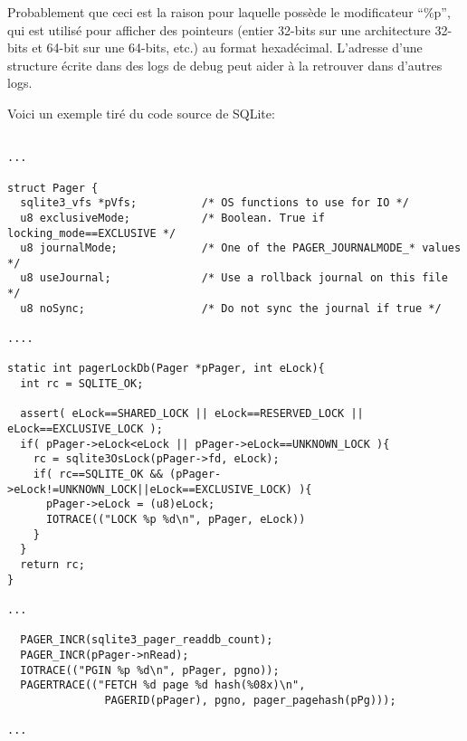 Probablement que ceci est la raison pour laquelle \printf possède le modificateur
``\%p'', qui est utilisé pour afficher des pointeurs (entier 32-bits sur une architecture
32-bits et 64-bit sur une 64-bits, etc.) au format hexadécimal.
L'adresse d'une structure écrite dans des logs de debug peut aider à la retrouver
dans d'autres logs.

Voici un exemple tiré du code source de SQLite:

\begin{lstlisting}

...

struct Pager {
  sqlite3_vfs *pVfs;          /* OS functions to use for IO */
  u8 exclusiveMode;           /* Boolean. True if locking_mode==EXCLUSIVE */
  u8 journalMode;             /* One of the PAGER_JOURNALMODE_* values */
  u8 useJournal;              /* Use a rollback journal on this file */
  u8 noSync;                  /* Do not sync the journal if true */

....

static int pagerLockDb(Pager *pPager, int eLock){
  int rc = SQLITE_OK;

  assert( eLock==SHARED_LOCK || eLock==RESERVED_LOCK || eLock==EXCLUSIVE_LOCK );
  if( pPager->eLock<eLock || pPager->eLock==UNKNOWN_LOCK ){
    rc = sqlite3OsLock(pPager->fd, eLock);
    if( rc==SQLITE_OK && (pPager->eLock!=UNKNOWN_LOCK||eLock==EXCLUSIVE_LOCK) ){
      pPager->eLock = (u8)eLock;
      IOTRACE(("LOCK %p %d\n", pPager, eLock))
    }
  }
  return rc;
}

...

  PAGER_INCR(sqlite3_pager_readdb_count);
  PAGER_INCR(pPager->nRead);
  IOTRACE(("PGIN %p %d\n", pPager, pgno));
  PAGERTRACE(("FETCH %d page %d hash(%08x)\n",
               PAGERID(pPager), pgno, pager_pagehash(pPg)));

...

\end{lstlisting}

